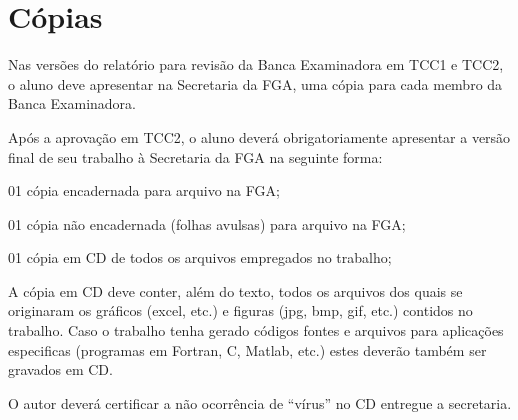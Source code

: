 \section{Cópias}

Nas versões do relatório para revisão da Banca Examinadora em TCC1 e TCC2, 
o aluno deve apresentar na Secretaria da FGA, uma cópia para cada membro da 
Banca Examinadora.

Após a aprovação em TCC2, o aluno deverá obrigatoriamente apresentar a 
versão final de seu trabalho à Secretaria da FGA na seguinte forma:

\begin{description}
	\item 01 cópia encadernada para arquivo na FGA;
	\item 01 cópia não encadernada (folhas avulsas) para arquivo na FGA;
	\item 01 cópia em CD de todos os arquivos empregados no trabalho;
\end{description}

A cópia em CD deve conter, além do texto, todos os arquivos dos quais se 
originaram os gráficos (excel, etc.) e figuras (jpg, bmp, gif, etc.) 
contidos no trabalho. Caso o trabalho tenha gerado códigos fontes e 
arquivos para aplicações especificas (programas em Fortran, C, Matlab, 
etc.) estes deverão também ser gravados em CD. 

O autor deverá certificar a não ocorrência de “vírus” no CD entregue a 
secretaria. 

